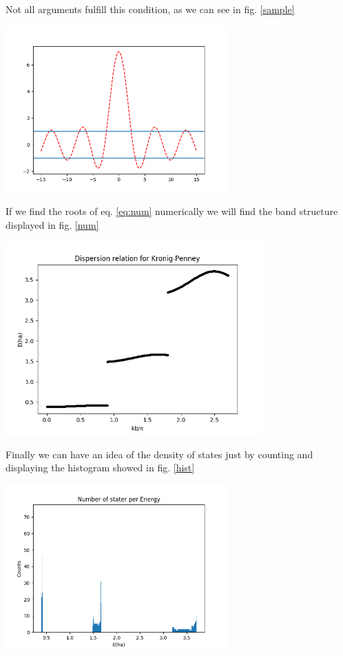 \begin{questions}
\begin{solution}
 Not all arguments fulfill this condition, as we can see in fig. \ref{sample}

 \begin{center}
   \includegraphics[width=85mm]{sample}
 \end{center}

 \label{sample}\vspace{0.5cm}


If we find the roots of eq. \ref{eq:num} numerically we will find the band structure displayed in fig. \ref{num}

 \begin{center}
   \includegraphics[width=99mm]{numsol}
 \end{center}

 \label{num}\vspace{0.5cm}

Finally we can have an idea of the density of states just by counting and displaying the histogram showed in fig. \ref{hist}

\begin{center}
  \includegraphics[width=85mm]{hist}
\end{center}


\end{solution}
\end{questions}
